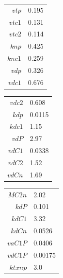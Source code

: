 \documentclass[11pt, letterpaper]{article}
\begin{document}
\begin{model}
\begin{supertabular}{rl}
$vtp $  & 0.195   \\
$vtc1$  & 0.131   \\
$vtc2$  & 0.114   \\
$knp $  & 0.425   \\
$knc1$  & 0.259   \\
$vdp $  & 0.326   \\
$vdc1$  & 0.676   \\
\bottomrule\end{supertabular}\hfil
\begin{supertabular}{rl}
$vdc2$ & 0.608   \\
$kdp $ & 0.0115  \\
$kdc1$ & 1.15    \\
$vdP $ & 2.97    \\
$vdC1$ & 0.0338  \\
$vdC2$ & 1.52    \\
$vdCn$ & 1.69    \\
\bottomrule\end{supertabular}\hfil
\begin{supertabular}{rl}
$MC2n $ & 2.02    \\
$kdP  $ & 0.101   \\
$kdC1 $ & 3.32    \\
$kdCn $ & 0.0526  \\
$vaC1P$ & 0.0406  \\
$vdC1P$ & 0.00175 \\
$ktxnp$ & 3.0     \\
\bottomrule\end{supertabular}
\end{model}
\end{document}

